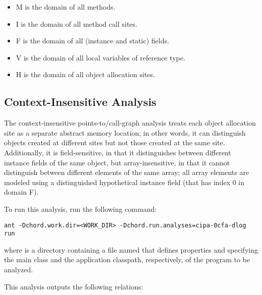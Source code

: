 \texonly{\newpage}

\begin{itemize}
\item M is the domain of all methods.
\item I is the domain of all method call sites.
\item F is the domain of all (instance and static) fields.
\item V is the domain of all local variables of reference type.
\item H is the domain of all object allocation sites.
\end{itemize}

\subsection{Context-Insensitive Analysis}

The context-insensitive points-to/call-graph analysis 
treats each object allocation site as a separate abstract memory location; in other words, it
can distinguish objects created at different sites but not those created at the same site.
Additionally, it is field-sensitive, in that it distinguishes between different instance fields of the same object,
but array-insensitive, in that it cannot distinguish between different elements of the same array;
all array elements are modeled using a distinguished hypothetical instance field (that has index 0 in domain F).

To run this analysis, run the following command:

\begin{framed}
\begin{verbatim}
ant -Dchord.work.dir=<WORK_DIR> -Dchord.run.analyses=cipa-0cfa-dlog run
\end{verbatim}
\end{framed}

where  is a directory
containing a file named  that defines
properties  and  specifying
the main class and the application classpath, respectively, of the program
to be analyzed.

This analysis outputs the following relations:


